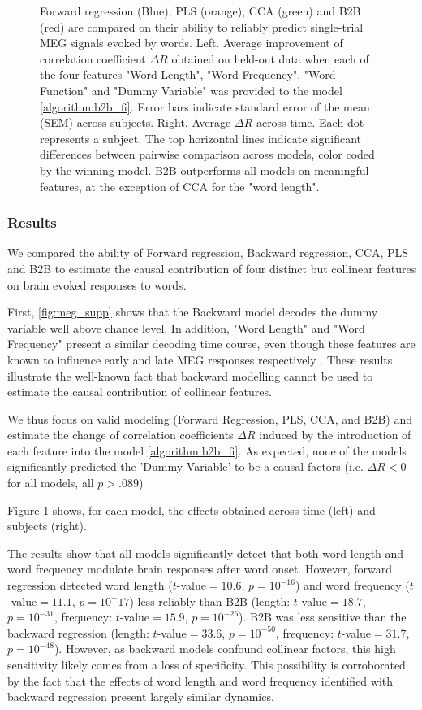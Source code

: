\begin{figure}[t!]
  \caption{Forward regression (Blue), PLS (orange), CCA (green) and B2B (red) are compared on their ability to reliably predict single-trial MEG signals evoked by words. Left. Average improvement of correlation coefficient $\Delta R$ obtained on held-out data when each of the four features "Word Length", "Word Frequency", "Word Function" and "Dummy Variable" was provided to the model \ref{algorithm:b2b_fi}. Error bars indicate standard error of the mean (SEM) across subjects. Right. Average $\Delta R$ across time. Each dot represents a subject. The top horizontal lines indicate significant differences between pairwise comparison across models, color coded by the winning model. B2B outperforms all models on meaningful features, at the exception of CCA for the "word length".}
  \label{fig:meg_results}
\end{figure}

\subsubsection{Results}
We compared the ability of Forward regression, Backward regression, CCA, PLS and B2B to estimate the causal contribution of four distinct but collinear features on brain evoked responses to words.

First, \ref{fig:meg_supp} shows that the Backward model decodes the dummy variable well above chance level. In addition, "Word Length" and  "Word Frequency" present a similar decoding time course, even though these features are known to influence early and late MEG responses respectively \citep{kutas2011thirty}. These results illustrate the well-known fact that backward modelling cannot be used to estimate the causal contribution of collinear features.

We thus focus on valid modeling (Forward Regression, PLS, CCA, and B2B) and estimate the change of correlation coefficients $\Delta R$ induced by the introduction of each feature into the model \ref{algorithm:b2b_fi}. As expected, none of the models significantly predicted the 'Dummy Variable' to be a causal factors (i.e. $\Delta R < 0$ for all models, all $p > .089$)


Figure \ref{fig:meg_results} shows, for each model, the effects obtained across time (left) and subjects (right).


The results show that all models significantly detect that both word length and
word frequency modulate brain responses after word onset. However,
forward regression detected word length ($t$-value$=10.6$, $p=10^{-16}$) and
word frequency ($t$-value$=11.1$, $p=10^-17$) less reliably than B2B (length:
$t$-value$=18.7$, $p=10^{-31}$, frequency: $t$-value$=15.9$, $p=10^{-26}$). B2B
was less sensitive than the backward regression (length: $t$-value$=33.6$,
$p=10^{-50}$, frequency: $t$-value$=31.7$, $p=10^{-48}$). However, as backward models confound collinear factors, this high sensitivity likely comes from a loss of specificity. This possibility is corroborated by the fact that the effects of word length and word frequency identified with backward regression present largely similar dynamics.

